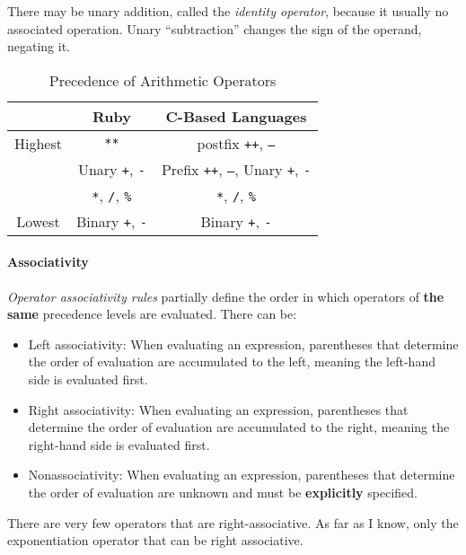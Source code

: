 There may be unary addition, called the \emph{identity operator}, because it usually no associated operation.
Unary ``subtraction'' changes the sign of the operand, negating it.

\begin{table}[h!]
  \centering
  \begin{tabular}{c|cc}
    \toprule
    & Ruby & C-Based Languages \\
    \midrule
    Highest & \texttt{**} & postfix \texttt{++}, \texttt{--} \\
    & Unary \texttt{+}, \texttt{-} & Prefix \texttt{++}, \texttt{--}, Unary \texttt{+}, \texttt{-} \\
    & \texttt{*}, \texttt{/}, \texttt{\%} & \texttt{*}, \texttt{/}, \texttt{\%} \\
    Lowest & Binary \texttt{+}, \texttt{-} & Binary \texttt{+}, \texttt{-} \\
    \bottomrule
  \end{tabular}
  \caption{Precedence of Arithmetic Operators}
  \label{tab:Operator_Evaluation_Order-Precedence}
\end{table}

\paragraph{Associativity}\label{par:Operator_Evaluation_Order-Associativity}
\begin{definition}\label{def:Operator_Associativity_Rules}
  \emph{Operator associativity rules} partially define the order in which operators of \textbf{the same} precedence levels are evaluated.
  There can be:
  \begin{itemize}[noitemsep]
  \item Left associativity: When evaluating an expression, parentheses that determine the order of evaluation are accumulated to the left, meaning the left-hand side is evaluated first.
  \item Right associativity: When evaluating an expression, parentheses that determine the order of evaluation are accumulated to the right, meaning the right-hand side is evaluated first.
  \item Nonassociativity: When evaluating an expression, parentheses that determine the order of evaluation are unknown and must be \textbf{explicitly} specified.
  \end{itemize}

  \begin{remark}
    There are very few operators that are right-associative.
    As far as I know, only the exponentiation operator that can be right associative.
  \end{remark}
\end{definition}

